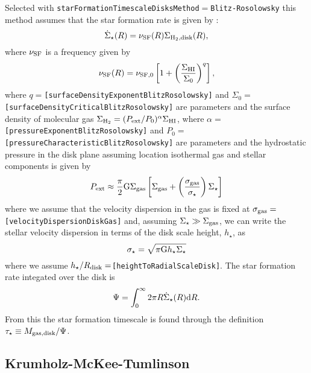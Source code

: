 Selected with {\tt starFormationTimescaleDisksMethod}$=${\tt Blitz-Rosolowsky} this method assumes that the star formation rate is given by \citep{blitz_role_2006}:
\begin{equation}
 \dot{\Sigma}_\star(R) = \nu_{\rm SF}(R) \Sigma_{\rm H_2, disk}(R),
\end{equation}
where $\nu_{\rm SF}$ is a frequency given by
\begin{equation}
 \nu_{\rm SF}(R) = \nu_{\rm SF,0} \left[ 1 + \left({\Sigma_{\rm HI}\over \Sigma_0}\right)^q \right],
\end{equation}
where $q=${\tt [surfaceDensityExponentBlitzRosolowsky]} and $\Sigma_0=${\tt [surfaceDensityCriticalBlitzRosolowsky]} are parameters and the surface density of molecular gas $\Sigma_{\rm H_2} = (P_{\rm ext}/P_0)^\alpha \Sigma_{\rm HI}$, where $\alpha=${\tt [pressureExponentBlitzRosolowsky]} and $P_0=${\tt [pressureCharacteristicBlitzRosolowsky]} are parameters and the hydrostatic pressure in the disk plane assuming location isothermal gas and stellar components is given by
\begin{equation}
 P_{\rm ext} \approx {\pi\over 2} \G \Sigma_{\rm gas} \left[ \Sigma_{\rm gas} + \left({\sigma_{\rm gas}\over \sigma_\star}\right)\Sigma_\star\right]
\end{equation}
where we assume that the velocity dispersion in the gas is fixed at $\sigma_{\rm gas}=${\tt [velocityDispersionDiskGas]} and, assuming $\Sigma_\star \gg \Sigma_{\rm gas}$, we can write the stellar velocity dispersion in terms of the disk scale height, $h_\star$, as
\begin{equation}
 \sigma_\star = \sqrt{\pi \G h_\star \Sigma_\star}
\end{equation}
where we assume $h_\star/R_{\rm disk}=${\tt [heightToRadialScaleDisk]}. The star formation rate integated over the disk is
\begin{equation}
 \Psi = \int_0^\infty 2 \pi R \dot{\Sigma}_\star(R) \d R.
\end{equation}
From this the star formation timescale is found through the definition $\tau_\star \equiv M_{\rm gas, disk}/\Psi$.

\subsection{Krumholz-McKee-Tumlinson}\label{sec:StarFormationKMT09}

